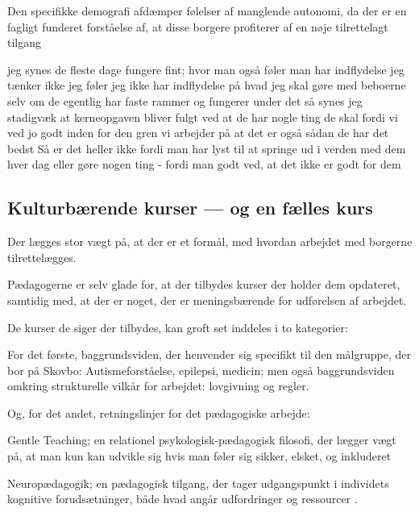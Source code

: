Den specifikke demografi afdæmper følelser af manglende autonomi, da der er en fagligt funderet forståelse af, at disse borgere profiterer af en nøje tilrettelagt tilgang
\begin{description}

\AMB
jeg synes de fleste dage fungere fint; hvor man også føler man har indflydelse
jeg tænker ikke jeg føler jeg ikke har indflydelse på hvad jeg skal gøre med beboerne selv om de egentlig har faste rammer og fungerer under det så synes jeg stadigvæk at kerneopgaven bliver fulgt ved at de har nogle ting de skal fordi vi ved jo godt inden for den gren vi arbejder på at det er også sådan de har det bedst
Så er det heller ikke fordi man har lyst til at springe ud i verden med dem hver dag eller gøre nogen ting - fordi man godt ved, at det ikke er godt for dem
\end{description}

\subsection{Kulturbærende kurser — og en fælles kurs}
Der lægges stor vægt på, at der er et formål, med hvordan arbejdet med borgerne tilrettelægges.

Pædagogerne er selv glade for, at der tilbydes kurser der holder dem opdateret, samtidig med, at der er noget, der er meningsbærende for udførelsen af arbejdet.

De kurser de siger der tilbydes, kan groft set inddeles i to kategorier:

For det første, baggrundsviden, der henvender sig specifikt til den målgruppe, der bor på Skovbo: Autismeforståelse, epilepsi, medicin; men også baggrundsviden omkring strukturelle vilkår for arbejdet: lovgivning og regler.

Og, for det andet, retningslinjer for det pædagogiske arbejde:

Gentle Teaching; en relationel psykologisk-pædagogisk filosofi, der lægger vægt på, at man kun kan udvikle sig hvis man føler sig sikker, elsket, og inkluderet \autocite[s. 3]{mcgeeGentleTeachingNensom2010}

Neuropædagogik; en pædagogisk tilgang, der tager udgangspunkt i individets kognitive forudsætninger, både hvad angår udfordringer og ressourcer \autocite{socialstyrelsenNeuropaedagogik2018}.

